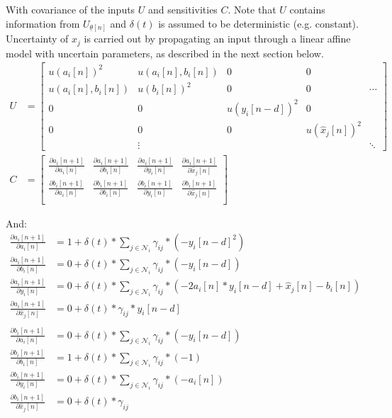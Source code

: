 \documentclass[10pt,a4paper,onecolumn]{article}
\renewcommand{\vec}[1]{\underline{#1}}
\begin{document}
    With covariance of the inputs $U$ and sensitivities $C$. Note that $U$ contains information from $U_{\vec{\theta}[n]}$ and $\delta(t)$ is assumed to be deterministic (e.g. constant). Uncertainty of $\hat{x}_j$ is carried out by propagating an input through a linear affine model with uncertain parameters, as described in the next section below. 
    \begin{align}
        U &= 
        \begin{bmatrix}
            u(a_i[n])^2 & u(a_i[n], b_i[n]) & 0 & 0 & \\
            u(a_i[n], b_i[n]) & u(b_i[n])^2 & 0 & 0 & \cdots \\
            0 & 0 & u(y_i[n-d])^2 & 0 & \\
            0 & 0 & 0 & u(\hat{x}_j[n])^2 & \\
            & \vdots & & & \ddots
        \end{bmatrix} \\
        C &=
        \begin{bmatrix}
            \frac{\partial a_i[n+1]}{\partial a_i[n]} & \frac{\partial a_i[n+1]}{\partial b_i[n]} & \frac{\partial a_i[n+1]}{\partial y_i[n]} & \frac{\partial a_i[n+1]}{\partial \hat{x}_j[n]} \\
            \frac{\partial b_i[n+1]}{\partial a_i[n]} & \frac{\partial b_i[n+1]}{\partial b_i[n]} & \frac{\partial b_i[n+1]}{\partial y_i[n]} & \frac{\partial b_i[n+1]}{\partial \hat{x}_j[n]} \\
        \end{bmatrix}
    \end{align}
    
    And:
    \begin{align}
        \frac{\partial a_i[n+1]}{\partial a_i[n]} &= 1 + \delta(t) * \sum_{j \in \mathcal{N}_i} \gamma_{ij} * (- {y_i}[n-d]^2) \label{eq:stankovic_sensitivity_1} \\
        \frac{\partial a_i[n+1]}{\partial b_i[n]} &= 0 + \delta(t) * \sum_{j \in \mathcal{N}_i} \gamma_{ij} * (- y_i[n-d]) \\
        \frac{\partial a_i[n+1]}{\partial y_i[n]} &= 0 + \delta(t) * \sum_{j \in \mathcal{N}_i} \gamma_{ij} * (-2 a_i[n] * y_i[n-d] + \hat{x}_j[n] - b_i[n]) \\
        \frac{\partial a_i[n+1]}{\partial \hat{x}_j[n]} &= 0 + \delta(t) * \gamma_{ij} * y_i[n-d]\\
        \nonumber\\
        \frac{\partial b_i[n+1]}{\partial a_i[n]} &= 0 + \delta(t) * \sum_{j \in \mathcal{N}_i} \gamma_{ij} * (- y_i[n-d]) \\
        \frac{\partial b_i[n+1]}{\partial b_i[n]} &= 1 + \delta(t) * \sum_{j \in \mathcal{N}_i} \gamma_{ij} * (- 1) \\
        \frac{\partial b_i[n+1]}{\partial y_i[n]} &= 0 + \delta(t) * \sum_{j \in \mathcal{N}_i} \gamma_{ij} * (- a_i[n]) \\
        \frac{\partial b_i[n+1]}{\partial \hat{x}_j[n]} &= 0 + \delta(t) * \gamma_{ij}
    \end{align}    
    
\end{document}
